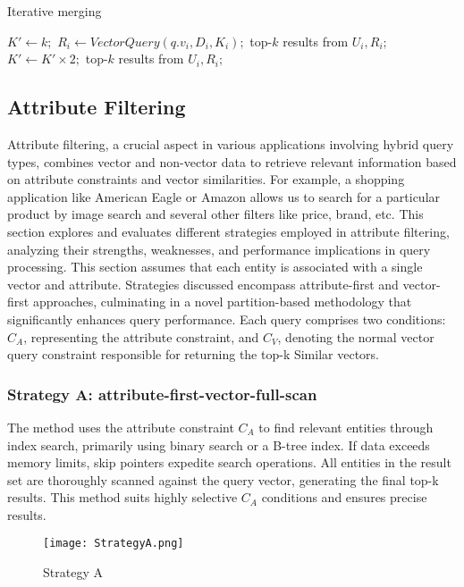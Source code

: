 \documentclass[conference]{IEEEtran}
\begin{document}
\begin{algorithm}[H]
  \caption{Iterative merging}
  \begin{algorithmic}[1]
    \State $K' \gets k;$
        \State $R_i \gets VectorQuery(q.v_i, D_i, K_i);$
          \State \Return top-$k$ results from $U_i,R_i;$
        \Else
          \State $K' \gets K' \times 2;$
        \EndIf
      \EndFor
      \State \Return top-$k$ results from $U_i,R_i;$
    \EndWhile
  \end{algorithmic}
\end{algorithm}


\subsection{Attribute Filtering}
Attribute filtering, a crucial aspect in various applications
involving hybrid query types, combines vector and non-vector
data to retrieve relevant information based on attribute
constraints and vector similarities. For example, a shopping
application like American Eagle or Amazon allows us
to search for a particular product by image search and several
other filters like price, brand, etc. This section explores and
evaluates different strategies employed in attribute filtering,
analyzing their strengths, weaknesses, and performance
implications in query processing. This section assumes that
each entity is associated with a single vector and 
attribute. Strategies discussed encompass attribute-first and
vector-first approaches, culminating in a novel partition-based
methodology that significantly enhances query performance.
Each query comprises two conditions: $C_A$,
representing the attribute constraint, and $C_V$, denoting the
normal vector query constraint responsible for returning the top-k Similar vectors.\\
\subsubsection{Strategy A: attribute-first-vector-full-scan}\cite{10.1145/3448016.3457550}
The method uses the attribute constraint $C_A$ to find relevant entities through index search, primarily using binary search or a B-tree index. If data exceeds memory limits, skip pointers expedite search operations. All entities in the result set are thoroughly scanned against the query vector, generating the final top-k results. This method suits highly selective $C_A$ conditions and ensures precise results.
\begin{figure}[h!]
  \centering
  \texttt{[image: StrategyA.png]}
  \caption{Strategy A}
  \label{fig: Strategy A}
\end{figure}
\\
\end{document}
